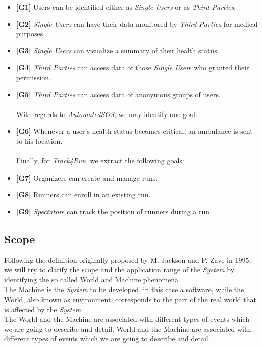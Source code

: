 \documentclass[titlepage]{article}
\begin{document}
		\begin{itemize} %

   			 \item {\bf [G1]} Users can be identified either as {\it {\it Single User}s} or as {\it Third Parties}.				
			 \item {\bf [G2]} {\it {\it Single User}s} can have their data monitored by {\it Third Parties} for medical purposes.
   			 \item {\bf [G3]} {\it {\it Single User}s} can visualize a summary of their health status.
   			 \item {\bf [G4]} {\it Third Parties} can access data of those {\it Single User}s who granted their permission.
   			 \item {\bf [G5]} {\it Third Parties} can access data of anonymous groups of users. \\
			 \\
With regards to {\it {\it AutomatedSOS}}, we may identify one goal: 
   			 \item {\bf [G6]} Whenever a user’s health status becomes critical, an ambulance is sent to his location. \\	
			 \\
 Finally, for {\it Track4Run}, we extract the following goals:
			  \item {\bf [G7]} Organizers can create and manage runs.
			  \item {\bf [G8]} Runners can enroll in an existing run.
			  \item {\bf [G9]} {\it Spectator}s can track the position of runners during a run.
			\end{itemize}
			
	\subsection{Scope}
Following the definition originally proposed by M. Jackson and P. Zave in 1995, we will try to clarify the scope and the application range of the {\it System} by identifying the so called World and Machine phenomena.\\
The Machine is the {\it System} to be developed, in this case a software, while the World, also known as environment, corresponds to the part of the real world that is affected by the {\it System}. \\
The World and the Machine are associated with different types of events which we are going to describe and detail.
World and the Machine are associated with different types of events which we are going to describe and detail.\\		
\end{document}
